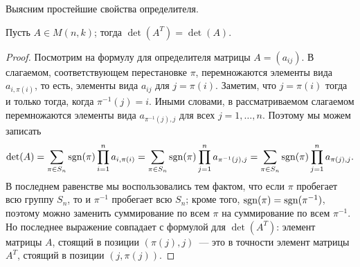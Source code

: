 Выясним простейшие свойства определителя.
\begin{proposition}
Пусть $A\in M(n,k)$; тогда $\det(A^T)=\det(A)$.
\end{proposition}
\begin{proof}
Посмотрим на формулу для определителя матрицы $A=(a_{ij})$. В
слагаемом, соответствующем
перестановке $\pi$, перемножаются элементы вида $a_{i,\pi(i)}$, то
есть, элементы вида $a_{ij}$ для $j=\pi(i)$. Заметим, что $j=\pi(i)$
тогда и только тогда, когда $\pi^{-1}(j)=i$. Иными словами, в
рассматриваемом слагаемом перемножаются элементы вида
$a_{\pi^{-1}(j),j}$ для всех $j=1,\dots,n$.
Поэтому мы можем записать
$$
\det(A)=\sum_{\pi\in S_n}\operatorname{sgn}(\pi)\prod_{i=1}^n a_{i,\pi(i)}
=\sum_{\pi\in S_n}\operatorname{sgn}(\pi)\prod_{j=1}^n a_{\pi^{-1}(j),j}
=\sum_{\pi\in S_n}\operatorname{sgn}(\pi)\prod_{j=1}^n a_{\pi(j),j}.
$$
В последнем равенстве мы воспользовались тем фактом, что если $\pi$
пробегает всю группу $S_n$, то и $\pi^{-1}$ пробегает всю $S_n$; кроме
того, $\operatorname{sgn}(\pi)=\operatorname{sgn}(\pi^{-1})$, поэтому можно заменить суммирование
по всем $\pi$ на суммирование по всем $\pi^{-1}$.
Но последнее выражение совпадает с формулой для $\det(A^T)$: элемент
матрицы $A$, стоящий в позиции $(\pi(j),j)$~--- это в точности элемент
матрицы $A^T$, стоящий в позиции $(j,\pi(j))$.
\end{proof}

